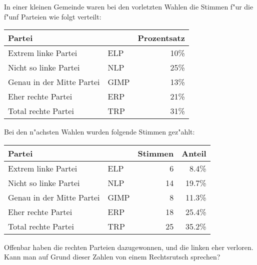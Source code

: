 In einer kleinen Gemeinde waren bei den vorletzten Wahlen die
Stimmen f"ur die f"unf Parteien wie folgt verteilt:
\begin{center}
\begin{tabular}{ll|r}
Partei                   &    &Prozentsatz\\
\hline
Extrem linke Partei      &ELP & 10\%\\
Nicht so linke Partei    &NLP & 25\%\\
Genau in der Mitte Partei&GIMP& 13\%\\
Eher rechte Partei       &ERP & 21\%\\
Total rechte Partei      &TRP & 31\%\\
\hline
\end{tabular}
\end{center}
Bei den n"achsten Wahlen wurden folgende Stimmen gez"ahlt:
\begin{center}
\begin{tabular}{ll|rr}
Partei                   &    &Stimmen&Anteil\\
\hline
Extrem linke Partei      &ELP &  6    & 8.4\%\\
Nicht so linke Partei    &NLP & 14    &19.7\%\\
Genau in der Mitte Partei&GIMP&  8    &11.3\%\\
Eher rechte Partei       &ERP & 18    &25.4\%\\
Total rechte Partei      &TRP & 25    &35.2\%\\
\hline
\end{tabular}
\end{center}
Offenbar haben die rechten Parteien dazugewonnen, und die linken
eher verloren.
Kann man auf Grund dieser Zahlen von einem Rechtsrutsch sprechen?

